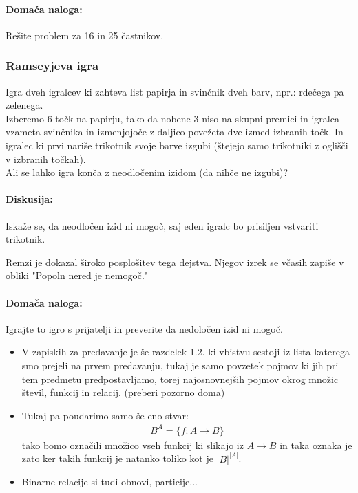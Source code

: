 \paragraph{Domača naloga:} Rešite problem za 16 in 25 častnikov.

\subsubsection{Ramseyjeva igra}

Igra dveh igralcev ki zahteva list papirja in svinčnik dveh barv, npr.: rdečega pa zelenega. \\[1em]
Izberemo 6 točk na papirju, tako da nobene 3 niso na skupni premici in igralca vzameta svinčnika in izmenjojoče z daljico povežeta dve izmed izbranih točk. In igralec ki prvi nariše trikotnik svoje barve izgubi (štejejo samo trikotniki z oglišči v izbranih točkah). \\[1em]
Ali se lahko igra konča z neodločenim izidom (da nihče ne izgubi)?

\paragraph{Diskusija:}
Iskaže se, da neodločen izid ni mogoč, saj eden igralc bo prisiljen vstvariti trikotnik.



\noindent
Remzi je dokazal široko posplošitev tega dejstva. Njegov izrek se včasih zapiše v obliki "Popoln nered je nemogoč."

\paragraph{Domača naloga:} Igrajte to igro s prijatelji in preverite da nedoločen izid ni mogoč.

\begin{komentar}
    \begin{itemize}
        \item V zapiskih za predavanje je še razdelek 1.2. ki vbistvu sestoji iz lista katerega smo prejeli na prvem predavanju, tukaj je samo povzetek pojmov ki jih pri tem predmetu predpostavljamo, torej najosnovnejših pojmov okrog množic števil, funkcij in relacij. (preberi pozorno doma)
        \item Tukaj pa poudarimo samo še eno stvar:
        \begin{align*}
            B^A = \{f : A \to B \}
        \end{align*}
        tako bomo označili množico vseh funkcij ki slikajo iz $A \to B$ in taka oznaka je zato ker takih funkcij je natanko toliko kot je $|B|^{|A|}$.
        \item Binarne relacije si tudi obnovi, particije...
    \end{itemize}    
\end{komentar}

